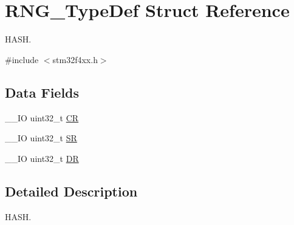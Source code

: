 \hypertarget{struct_r_n_g___type_def}{\section{R\-N\-G\-\_\-\-Type\-Def Struct Reference}
\label{struct_r_n_g___type_def}
}


H\-A\-S\-H.  




{\ttfamily \#include $<$stm32f4xx.\-h$>$}

\subsection*{Data Fields}
\begin{DoxyCompactItemize}
\item 
\-\_\-\-\_\-\-I\-O uint32\-\_\-t \hyperlink{struct_r_n_g___type_def_ab40c89c59391aaa9d9a8ec011dd0907a}{C\-R}
\item 
\-\_\-\-\_\-\-I\-O uint32\-\_\-t \hyperlink{struct_r_n_g___type_def_af6aca2bbd40c0fb6df7c3aebe224a360}{S\-R}
\item 
\-\_\-\-\_\-\-I\-O uint32\-\_\-t \hyperlink{struct_r_n_g___type_def_a3df0d8dfcd1ec958659ffe21eb64fa94}{D\-R}
\end{DoxyCompactItemize}


\subsection{Detailed Description}
H\-A\-S\-H. 

